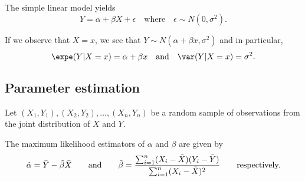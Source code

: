 The simple linear model yields
\[
Y = \alpha + \beta X + \epsilon \quad\text{where}\quad \epsilon\sim N(0,\sigma^2).
\]

\bigskip
If we observe that $X=x$, we see that $Y\sim N(\alpha+\beta x, \sigma^2)$ and in particular,
\[
\expe(Y|X=x) = \alpha + \beta x
\quad\text{and}\quad
\var(Y|X=x) = \sigma^2.
\]

\subsection{Parameter estimation}
Let $(X_1,Y_1),(X_2,Y_2),\ldots,(X_n,Y_n)$ be a random sample of observations from the joint distribution of $X$ and $Y$. 
\begin{theorem}
The maximum likelihood estimators of $\alpha$ and $\beta$ are given by
\[
\hat{\alpha} = \bar{Y}-\hat{\beta}\bar{X}
\text{\qquad and\qquad}
\hat{\beta} = \frac{\sum_{i=1}^n (X_i-\bar{X})(Y_i-\bar{Y})}{\sum_{i=1}^n (X_i-\bar{X})^2}
\text{\qquad respectively.}
\]
\end{theorem}

